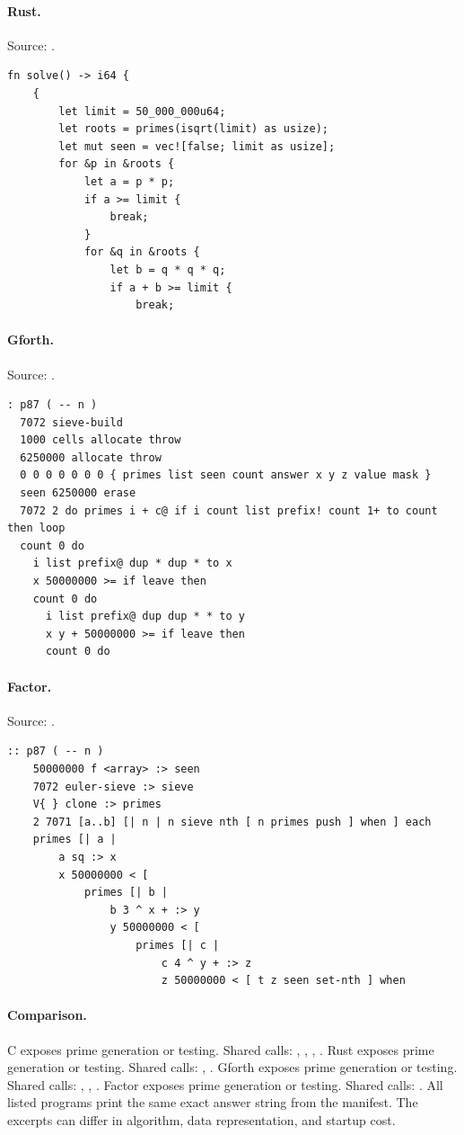 \paragraph{Rust.} Source: .
\begin{lstlisting}
fn solve() -> i64 {
    {
        let limit = 50_000_000u64;
        let roots = primes(isqrt(limit) as usize);
        let mut seen = vec![false; limit as usize];
        for &p in &roots {
            let a = p * p;
            if a >= limit {
                break;
            }
            for &q in &roots {
                let b = q * q * q;
                if a + b >= limit {
                    break;
\end{lstlisting}

\paragraph{Gforth.} Source: .
\begin{lstlisting}
: p87 ( -- n )
  7072 sieve-build
  1000 cells allocate throw
  6250000 allocate throw
  0 0 0 0 0 0 0 { primes list seen count answer x y z value mask }
  seen 6250000 erase
  7072 2 do primes i + c@ if i count list prefix! count 1+ to count then loop
  count 0 do
    i list prefix@ dup * dup * to x
    x 50000000 >= if leave then
    count 0 do
      i list prefix@ dup dup * * to y
      x y + 50000000 >= if leave then
      count 0 do
\end{lstlisting}

\paragraph{Factor.} Source: .
\begin{lstlisting}
:: p87 ( -- n )
    50000000 f <array> :> seen
    7072 euler-sieve :> sieve
    V{ } clone :> primes
    2 7071 [a..b] [| n | n sieve nth [ n primes push ] when ] each
    primes [| a |
        a sq :> x
        x 50000000 < [
            primes [| b |
                b 3 ^ x + :> y
                y 50000000 < [
                    primes [| c |
                        c 4 ^ y + :> z
                        z 50000000 < [ t z seen set-nth ] when
\end{lstlisting}

\paragraph{Comparison.}
C exposes prime generation or testing. Shared calls: \texttt{}, \texttt{}, \texttt{}, \texttt{}. Rust exposes prime generation or testing. Shared calls: \texttt{}, \texttt{}. Gforth exposes prime generation or testing. Shared calls: \texttt{}, \texttt{}, \texttt{}. Factor exposes prime generation or testing. Shared calls: \texttt{}.
All listed programs print the same exact answer string from the manifest. The excerpts can differ in algorithm, data representation, and startup cost.

